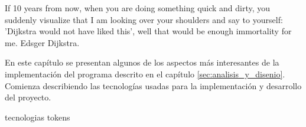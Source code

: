 %
%
%

\label{sec:implementacion}
{%
  If 10 years from now, when you are doing something quick and dirty, you
  suddenly visualize that I am looking over your shoulders and say to
  yourself: 'Dijkstra would not have liked this', well that would be enough
  immortality for me.%
}
{%
   Edsger Dijkstra.%
}

\noindent
En este capítulo se presentan algunos de los aspectos más interesantes de
la implementación del programa descrito en el capítulo
\ref{sec:analisis_y_disenio}. Comienza describiendo las tecnologías
usadas para la implementación y desarrollo del proyecto.

{tecnologias}
{tokens}
